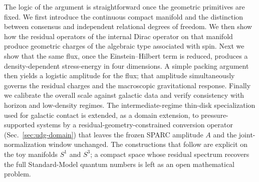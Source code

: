 \documentclass[11pt,a4paper]{article}
\begin{document}
The logic of the argument is straightforward once the geometric primitives are fixed. We first introduce the continuous compact manifold and the distinction between consensus and independent relational degrees of freedom. We then show how the residual operators of the internal Dirac operator on that manifold produce geometric charges of the algebraic type associated with spin. Next we show that the same flux, once the Einstein--Hilbert term is reduced, produces a density-dependent stress-energy in four dimensions. A simple packing argument then yields a logistic amplitude for the flux; that amplitude simultaneously governs the residual charges and the macroscopic gravitational response. Finally we calibrate the overall scale against galactic data and verify consistency with horizon and low-density regimes. The intermediate-regime thin-disk specialization used for galactic contact is extended, as a domain extension, to pressure-supported systems by a residual-geometry-constrained conversion operator (Sec.~\ref{sec:udg-domain}) that leaves the frozen SPARC amplitude \(A\) and the joint-normalization window unchanged. The constructions that follow are explicit on the toy manifolds \(S^1\) and \(S^3\); a compact space whose residual spectrum recovers the full Standard-Model quantum numbers is left as an open mathematical problem.
\end{document}
